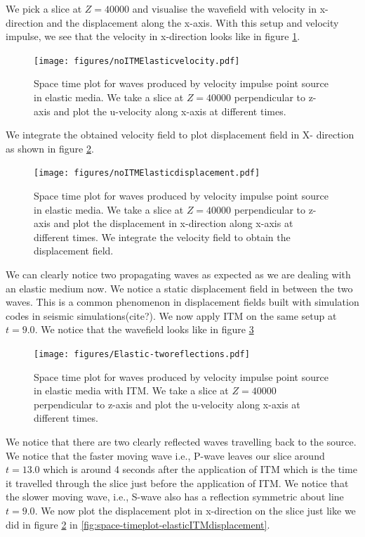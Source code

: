 We pick a slice at $Z = 40000$ and visualise the wavefield with velocity in x-direction and the displacement along the x-axis. With this setup and velocity impulse, 
we see that the velocity in x-direction looks like in figure \ref{fig:space-timeplot-elasticnoITM}.

\begin{figure}
    \centering
    \texttt{[image: figures/noITMElasticvelocity.pdf]}
    \caption{Space time plot for waves produced by velocity impulse point source in elastic media. We take a slice at $Z=40000$ perpendicular to z-axis
    and plot the u-velocity along x-axis at different times.}
    \label{fig:space-timeplot-elasticnoITM}
\end{figure}

We integrate the obtained velocity field to plot displacement field in X- direction as shown in figure \ref{fig:space-timeplot-elasticnoITMdisplacement}.

\begin{figure}
    \centering
    \texttt{[image: figures/noITMElasticdisplacement.pdf]}
    \caption{Space time plot for waves produced by velocity impulse point source in elastic media. We take a slice at $Z=40000$ perpendicular to z-axis
    and plot the displacement in x-direction along x-axis at different times. We integrate the velocity field to obtain the displacement field.}
    \label{fig:space-timeplot-elasticnoITMdisplacement}
\end{figure}

We can clearly notice two propagating waves as expected as we are dealing with an elastic medium now. We notice a static displacement field in between the two waves.
This is a common phenomenon in displacement fields built with simulation codes in seismic simulations(cite?). 
We now apply \ac{ITM} on the same setup at $t=9.0$. We notice that the wavefield looks like in figure \ref{fig:space-timeplot-elasticITM}

\begin{figure}
    \centering
    \texttt{[image: figures/Elastic-tworeflections.pdf]}
    \caption{Space time plot for waves produced by velocity impulse point source in elastic media with \ac{ITM}. We take a slice at $Z=40000$ perpendicular to z-axis
    and plot the u-velocity along x-axis at different times.}
    \label{fig:space-timeplot-elasticITM}
\end{figure}

We notice that there are two clearly reflected waves travelling back to the source. We notice that the faster moving wave i.e., P-wave leaves our slice around 
$t=13.0$ which is around 4 seconds after the application of \ac{ITM} which is the time it travelled through the slice just before the application of \ac{ITM}. 
We notice that the slower moving wave, i.e., S-wave also has a reflection symmetric about line $t=9.0$. We now plot the displacement plot in x-direction on the 
slice just like we did in figure \ref{fig:space-timeplot-elasticnoITMdisplacement} in \ref{fig:space-timeplot-elasticITMdisplacement}.

